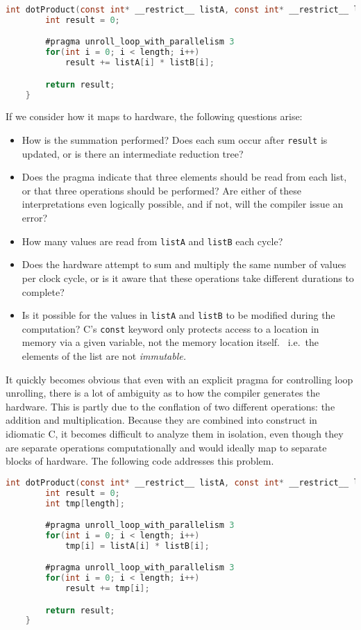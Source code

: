 \documentclass[english,onecolumn]{scrartcl}
\begin{document}
\begin{lstlisting}[language=C]
    int dotProduct(const int* __restrict__ listA, const int* __restrict__ listB, int length){
        int result = 0;

        #pragma unroll_loop_with_parallelism 3
        for(int i = 0; i < length; i++)
            result += listA[i] * listB[i];

        return result;
    }
\end{lstlisting}

If we consider how it maps to hardware, the following questions arise:
\begin{itemize}
    \item How is the summation performed? Does each sum occur after \texttt{result} is updated, or is there an intermediate
            reduction tree?
    \item Does the pragma indicate that three elements should be read from each list, or that three operations should be
        performed? Are either of these interpretations even logically possible, and if not, will the compiler issue an error?
    \item How many values are read from \texttt{listA} and \texttt{listB} each cycle?
    \item Does the hardware attempt to sum and multiply the same number of values per clock cycle, or is it aware that these
            operations take different durations to complete?
    \item Is it possible for the values in \texttt{listA} and \texttt{listB} to be modified during the computation? C's
        \texttt{const} keyword only protects access to a location in memory via a given variable, not the memory location itself.
        \ i.e.\ the elements of the list are not \textit{immutable.}
\end{itemize}

It quickly becomes obvious that even with an explicit pragma for controlling loop unrolling, there is a lot of ambiguity as to how
the compiler generates the hardware. This is partly due to the conflation of two different operations: the addition and
multiplication. Because they are combined into construct in idiomatic C, it becomes difficult to analyze them in isolation, even
though they are separate operations computationally and would ideally map to separate blocks of hardware. The following code
addresses this problem.

\begin{lstlisting}[language=C]
    int dotProduct(const int* __restrict__ listA, const int* __restrict__ listB, int length){
        int result = 0;
        int tmp[length];

        #pragma unroll_loop_with_parallelism 3
        for(int i = 0; i < length; i++)
            tmp[i] = listA[i] * listB[i];

        #pragma unroll_loop_with_parallelism 3
        for(int i = 0; i < length; i++)
            result += tmp[i];

        return result;
    }
\end{lstlisting}
\end{document}
